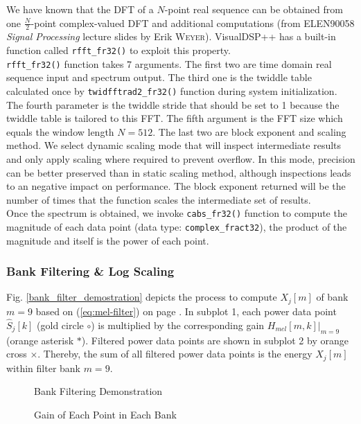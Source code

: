 We have known that the DFT of a $N$-point real sequence can be obtained from one $\frac{N}{2}$-point complex-valued DFT and additional computations (from ELEN90058 \textit{Signal Processing} lecture slides by Erik \textsc{Weyer}). VisualDSP++ has a built-in function called \texttt{rfft\_fr32()} to exploit this property.\\

\texttt{rfft\_fr32()} function takes 7 arguments. The first two are time domain real sequence input and spectrum output. The third one is the twiddle table calculated once by \texttt{twidfftrad2\_fr32()} function during system initialization. The fourth parameter is the twiddle stride that should be set to 1 because the twiddle table is tailored to this FFT. The fifth argument is the FFT size which equals the window length $N = 512$. The last two are block exponent and scaling method. We select dynamic scaling mode that will inspect intermediate results and only apply scaling where required to prevent overflow. In this mode, precision can be better preserved than in static scaling method, although inspections leads to an negative impact on performance. The block exponent returned will be the number of times that the function scales the intermediate set of results.\\

Once the spectrum is obtained, we invoke \texttt{cabs\_fr32()} function to compute the magnitude of each data point (data type: \texttt{complex\_fract32}), the product of the magnitude and itself is the power of each point.


\subsubsection{Bank Filtering \& Log Scaling}

Fig. \ref{bank_filter_demostration} depicts the process to compute $X_j[m]$ of bank $m = 9$ based on (\ref{eq:mel-filter}) on page \pageref{eq:mel-filter}. In subplot 1, each power data point $\hat{S}_j[k]$ (\textcolor{gold_matlab}{gold circle $\circ$}) is multiplied by the corresponding gain $H_{mel}[m, k]|_{m=9}$ (\textcolor{orange_matlab}{orange asterisk $*$}). Filtered power data points are shown in subplot 2 by \textcolor{orange_matlab}{orange cross $\times$}. Thereby, the sum of all filtered power data points is the energy $X_j[m]$ within filter bank $m = 9$.

\begin{figure}[H]
\begin{minipage}[t]{0.5\linewidth}
\centering
{}
\caption{Bank Filtering Demonstration}
\label{bank_filter_demostration}
\end{minipage}
\begin{minipage}[t]{0.5\linewidth}
\centering
{}
\caption{Gain of Each Point in Each Bank}
\label{mel_filter_bank_gain}
\end{minipage}
\end{figure}


